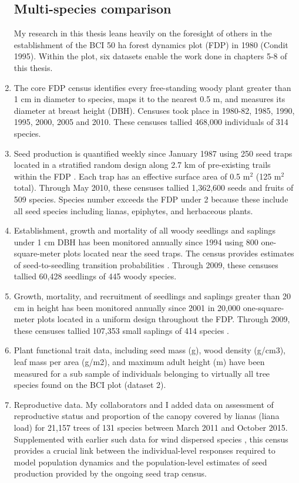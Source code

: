 \documentclass[b5paper,justified]{tufte-book} %
\begin{document}
\begin{fullwidth}
\begin{enumerate}
\subsection{Multi-species comparison}
My research in this thesis leans heavily on the foresight of others in the establishment of the BCI 50 ha forest dynamics plot (FDP) in 1980 (Condit 1995). Within the plot, six datasets enable the work done in chapters 5-8 of this thesis. 
\item The core FDP census identifies every free-standing woody plant greater than 1 cm in diameter to species, maps it to the nearest 0.5 m, and measures its diameter at breast height (DBH). Censuses took place in 1980-82, 1985, 1990, 1995, 2000, 2005 and 2010. These censuses tallied 468,000 individuals of 314 species. 
\item Seed production is quantified weekly since January 1987 using 250 seed traps located in a stratified random design along 2.7 km of pre-existing trails within the FDP \citep{Wright2005a}. Each trap has an effective surface area of 0.5 m$^2$ (125 m$^2$ total). Through May 2010, these censuses tallied 1,362,600 seeds and fruits of 509 species. Species number exceeds the FDP under 2 because these include all seed species including lianas, epiphytes, and herbaceous plants. 
\item  Establishment, growth and mortality of all woody seedlings and saplings under 1 cm DBH has been monitored annually since 1994 using 800 one-square-meter plots located near the seed traps. The census provides estimates of seed-to-seedling transition probabilities \citep{Harms2000a, Visser2016}. Through 2009, these censuses tallied 60,428 seedlings of 445 woody species.  
\item  Growth, mortality, and recruitment of seedlings and saplings greater than 20 cm in height has been monitored annually since 2001 in 20,000 one-square-meter plots located in a uniform design throughout the FDP. Through 2009, these censuses tallied 107,353 small saplings of 414 species \citep{Comita2010}. 
\item  Plant functional trait data, including seed mass (g), wood density (g/cm3), leaf mass per area (g/m2), and maximum adult height (m) have been measured for a sub sample of individuals belonging to virtually all tree species  found on the BCI plot (dataset 2). 
\item  Reproductive data. My collaborators and I added data on assessment of reproductive status and proportion of the canopy covered by lianas (liana load) for 21,157 trees of 131 species between March 2011 and October 2015. Supplemented with earlier such data for wind dispersed species \citep{Wright2005}, this census provides a crucial link between the individual-level responses required to model population dynamics and the population-level estimates of seed production provided by the ongoing seed trap census.
\end{enumerate}
\end{fullwidth} 
\end{document}
